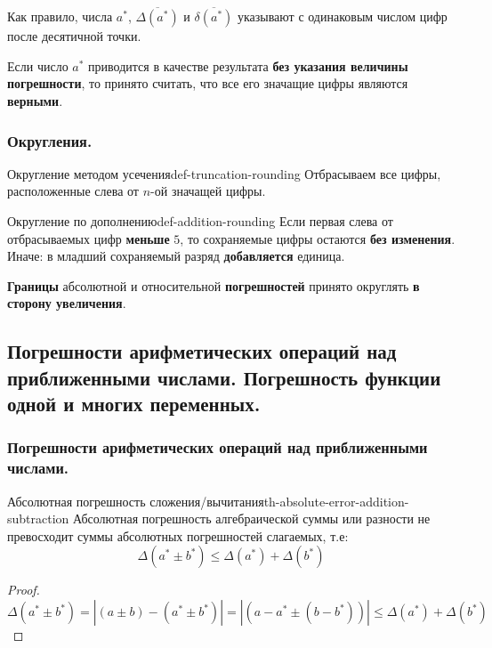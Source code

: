 \documentclass[14pt]{extarticle}
\begin{document}
    Как правило, числа $a^{*}$, $\overline{\Delta(a^{*})}$ и $\overline{\delta(a^{*})}$ указывают с одинаковым числом цифр после десятичной точки.

    \vspace{\baselineskip}
    
    Если число $a^{*}$ приводится в качестве результата \textbf{без указания величины погрешности}, то принято считать, что все его значащие цифры являются \textbf{верными}.

    \subsubsection{Округления.}

        \begin{definition}{Округление методом усечения}{def-truncation-rounding}
            Отбрасываем все цифры, расположенные слева от $n$-ой значащей цифры.
        \end{definition}

        \begin{definition}{Округление по дополнению}{def-addition-rounding}
            Если первая слева от отбрасываемых цифр \textbf{меньше} $5$, то сохраняемые цифры остаются \textbf{без изменения}.\\ 
            Иначе: в младший сохраняемый разряд \textbf{добавляется} единица.  
        \end{definition}

        \textbf{Границы} абсолютной и относительной \textbf{погрешностей} принято округлять \textbf{в сторону увеличения}.

\clearpage
\subsection{Погрешности арифметических операций над приближенными числами. Погрешность функции одной и многих переменных.}

    \subsubsection{Погрешности арифметических операций над приближенными числами.}
        
        \begin{theorem}{Абсолютная погрешность сложения/вычитания}{th-absolute-error-addition-subtraction}
            Абсолютная погрешность алгебраической суммы или разности не превосходит суммы абсолютных погрешностей слагаемых, т.е:
            $$\Delta(a^{*} \pm b^{*}) \leq \Delta(a^{*}) + \Delta(b^{*})$$
        
            \begin{proof}
                $$\Delta(a^{*} \pm b^{*}) = |(a \pm b) - (a^{*} \pm b^{*})| = |(a - a^{*} \pm (b - b^{*}))| \leq \Delta(a^{*}) + \Delta(b^{*})$$
            \end{proof}
        \end{theorem}
\end{document}
